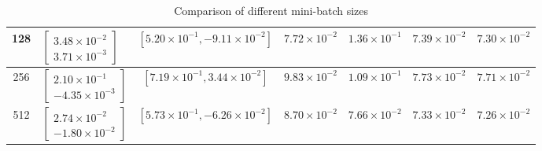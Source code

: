 \documentclass{article}
\begin{document}
\begin{table}[h!]
\begin{center}
\begin{tabular}{|c|m{3.3cm}|c|m{1.7cm}|m{1.7cm}|c|c|}
			\hline
			128 & $\begin{bmatrix}3.48\times 10^{-2} \\ 3.71\times 10^{-3}\end{bmatrix}$ & $[5.20\times 10^{-1}, -9.11\times 10^{-2}]$ & $7.72\times 10^{-2}$ & $1.36\times 10^{-1}$ & $7.39\times 10^{-2}$ & $7.30\times 10^{-2}$\\ 
			\hline
			256 & $\begin{bmatrix}2.10\times 10^{-1} \\ -4.35\times 10^{-3}\end{bmatrix}$ & $[7.19\times 10^{-1}, 3.44\times 10^{-2}]$ & $9.83\times 10^{-2}$ & $1.09\times 10^{-1}$ & $7.73\times 10^{-2}$ & $7.71\times 10^{-2}$\\ 
			\hline
			512 & $\begin{bmatrix}2.74\times 10^{-2} \\ -1.80\times 10^{-2}\end{bmatrix}$ & $[5.73\times 10^{-1}, -6.26\times 10^{-2}]$ & $8.70\times 10^{-2}$ & $7.66\times 10^{-2}$ & $7.33\times 10^{-2}$ & $7.26\times 10^{-2}$\\ 
			\hline
		\end{tabular}
	\end{center}
	\caption{Comparison of different mini-batch sizes}
	\label{table:1}
\end{table}
\end{document}
